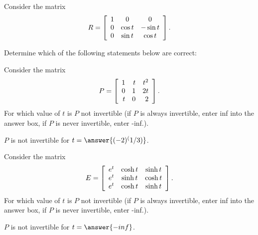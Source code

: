 \documentclass{ximera}
\begin{document}
\begin{problem}
  Consider the matrix
  \begin{equation*}
    R =
    \startmat{ccc}
      1 & 0 & 0 \\
      0 & \cos t & -\sin t \\
      0 & \sin t & \cos t \\
    \stopmat.
  \end{equation*}
  
  Determine which of the following statements below are correct:
  \begin{selectAll}
  \end{selectAll}
\end{problem}

\begin{problem}
  Consider the matrix
  \begin{equation*}
    P =
    \startmat{rrr}
      1 & t & t^2 \\
      0 & 1 & 2t \\
      t & 0 & 2
    \stopmat.
  \end{equation*}
  For which value of $t$ is $P$ not invertible (if $P$ is always invertible, enter inf into the answer box, if $P$ is never invertible, enter -inf.).

  $P$ is not invertible for $t=\answer{(-2)^(1/3)}$.
\end{problem}

\begin{problem}
  Consider the matrix
  \begin{equation*}
    E =
    \startmat{ccc}
      e^{t} & \cosh t & \sinh t \\
      e^{t} & \sinh t & \cosh t \\
      e^{t} & \cosh t & \sinh t
    \stopmat.
  \end{equation*}
  For which value of $t$ is $P$ not invertible (if $P$ is always invertible, enter inf into the answer box, if $P$ is never invertible, enter -inf.).

  $P$ is not invertible for $t=\answer{-inf}$.
\end{problem}
\end{document}
